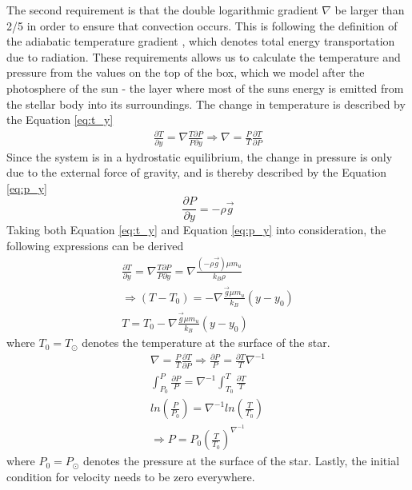 \documentclass[10pt, nofootinbib, twocolumn]{revtex4-1}
\begin{document}
The second requirement is that the double logarithmic gradient $\nabla$ be larger than 2/5 in order to ensure that convection occurs. This is following the definition of the adiabatic temperature gradient , which denotes total energy transportation due to radiation. These requirements allows us to calculate the temperature and pressure from the values on the top of the box, which we model after the photosphere of the sun - the layer where most of the suns energy is emitted \cite{solar} from the stellar body into its surroundings. The change in temperature is described by the Equation \eqref{eq:t_y}
\begin{equation}\label{eq:t_y}
\begin{split}
    \frac{\partial T}{\partial y} = \nabla \frac{T\partial P}{P\partial y} \Rightarrow \nabla = \frac{P}{T}\frac{\partial T}{\partial P}
\end{split}
\end{equation}
Since the system is in a hydrostatic equilibrium, the change in pressure is only due to the external force of gravity, and is thereby described by the Equation \eqref{eq:p_y}
\begin{equation}\label{eq:p_y}
    \frac{\partial P}{\partial y} = -\rho \vec{g}
\end{equation}
Taking both Equation \eqref{eq:t_y} and Equation \eqref{eq:p_y} into consideration, the following expressions can be derived
\begin{equation}\label{eq:t}
\begin{split}
    \frac{\partial T}{\partial y} = \nabla \frac{T\partial P}{P\partial y}= \nabla \frac{(-\rho \vec{g})\mu m_u}{k_B\rho} \\
    \Rightarrow (T-T_0) = -\nabla \frac{ \vec{g}\mu m_u}{k_B}(y-y_0)\\ T=T_0-\nabla \frac{ \vec{g}\mu m_u}{k_B}(y-y_0)
\end{split}
\end{equation}
where $T_0=T_\odot$ denotes the temperature at the surface of the star.
\begin{equation}\label{eq:p}
\begin{split}
    \nabla = \frac{P}{T}\frac{\partial T}{\partial P} \Rightarrow \frac{\partial P}{P} =\frac{\partial T}{T}\nabla^{-1}\\ \int_{P_0}^P{\frac{\partial P}{P}}=\nabla^{-1}\int_{T_0}^T{\frac{\partial T}{T}}\\ ln\left(\frac{P}{P_0}\right)=\nabla^{-1}ln\left(\frac{T}{T_0}\right)\\ \Rightarrow P = P_0\left(\frac{T}{T_0}\right)^{\nabla^{-1}}
\end{split}
\end{equation}
where $P_0=P_\odot$ denotes the pressure at the surface of the star.
Lastly, the initial condition for velocity needs to be zero everywhere. \\
\end{document}

